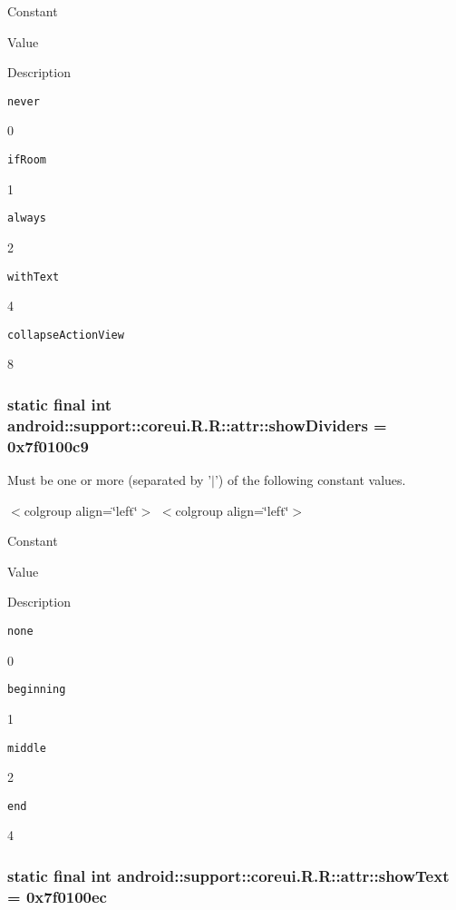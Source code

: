 Constant

Value

Description 

{\tt never}

0

{\tt ifRoom}

1

{\tt always}

2

{\tt withText}

4

{\tt collapseActionView}

8\hypertarget{classandroid_1_1support_1_1coreui_1_1_r_1_1attr_094a19d026333d976c2f3bdad946571d}{
\subsubsection[{showDividers}]{\setlength{\rightskip}{0pt plus 5cm}static final int android::support::coreui.R.R::attr::showDividers = 0x7f0100c9}}
\label{classandroid_1_1support_1_1coreui_1_1_r_1_1attr_094a19d026333d976c2f3bdad946571d}


Must be one or more (separated by '$|$') of the following constant values. \begin{TabularC}{0}
\hline
\end{TabularC}
$<$colgroup align=\char`\"{}left\char`\"{}$>$ $<$colgroup align=\char`\"{}left\char`\"{}$>$ 

Constant

Value

Description 

{\tt none}

0

{\tt beginning}

1

{\tt middle}

2

{\tt end}

4\hypertarget{classandroid_1_1support_1_1coreui_1_1_r_1_1attr_aa44cdd8acbbe909eadc6e02bfb1c1e4}{
\subsubsection[{showText}]{\setlength{\rightskip}{0pt plus 5cm}static final int android::support::coreui.R.R::attr::showText = 0x7f0100ec}}
\label{classandroid_1_1support_1_1coreui_1_1_r_1_1attr_aa44cdd8acbbe909eadc6e02bfb1c1e4}


